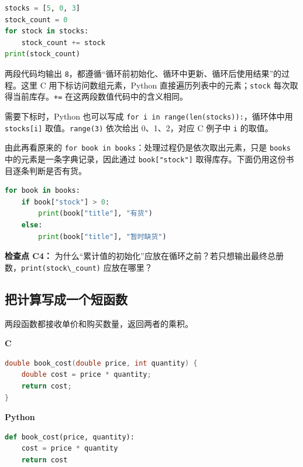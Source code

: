 \documentclass[UTF8,a4paper,11pt,fontset=fandol]{ctexart}
\providecommand{\passthrough}[1]{#1}
\begin{document}
\begin{lstlisting}[language=Python]
stocks = [5, 0, 3]
stock_count = 0
for stock in stocks:
    stock_count += stock
print(stock_count)
\end{lstlisting}

两段代码均输出 \passthrough{\lstinline!8!}，都遵循``循环前初始化、循环中更新、循环后使用结果''的过程。这里 C 用下标访问数组元素，Python 直接遍历列表中的元素；\passthrough{\lstinline!stock!} 每次取得当前库存。\passthrough{\lstinline!+=!} 在这两段数值代码中的含义相同。

需要下标时，Python 也可以写成 \passthrough{\lstinline!for i in range(len(stocks)):!}，循环体中用 \passthrough{\lstinline!stocks[i]!} 取值。\passthrough{\lstinline!range(3)!} 依次给出 0、1、2，对应 C 例子中 \passthrough{\lstinline!i!} 的取值。

由此再看原来的 \passthrough{\lstinline!for book in books!}：处理过程仍是依次取出元素，只是 \passthrough{\lstinline!books!} 中的元素是一条字典记录，因此通过 \passthrough{\lstinline!book["stock"]!} 取得库存。下面仍用这份书目逐条判断是否有货。

\begin{lstlisting}[language=Python]
for book in books:
    if book["stock"] > 0:
        print(book["title"], "有货")
    else:
        print(book["title"], "暂时缺货")
\end{lstlisting}

\textbf{检查点 C4：} 为什么``累计值的初始化''应放在循环之前？若只想输出最终总册数，\passthrough{\lstinline!print(stock\_count)!} 应放在哪里？

\clearpage

\subsection{把计算写成一个短函数}\label{ux628aux8ba1ux7b97ux5199ux6210ux4e00ux4e2aux77edux51fdux6570}

两段函数都接收单价和购买数量，返回两者的乘积。

\textbf{C}

\begin{lstlisting}[language=C]
double book_cost(double price, int quantity) {
    double cost = price * quantity;
    return cost;
}
\end{lstlisting}

\textbf{Python}

\begin{lstlisting}[language=Python]
def book_cost(price, quantity):
    cost = price * quantity
    return cost
\end{lstlisting}
\end{document}
